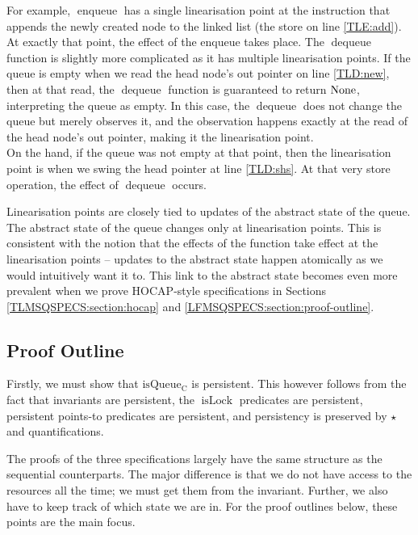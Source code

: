 \documentclass[a4paper, 10pt]{report}
\theoremstyle{definition}
\newcommand{\isLock}{\operatorname{isLock}}
\newcommand{\enqueue}{\operatorname{enqueue}}
\newcommand{\dequeue}{\operatorname{dequeue}}
\newcommand{\isqueueconc}{\operatorname{isQueue_{C}}}
\begin{document}
For example, $\enqueue$ has a single linearisation point at the instruction that appends the newly created node to the linked list (the store on line \ref{TLE:add}). At exactly that point, the effect of the enqueue takes place. The $\dequeue$ function is slightly more complicated as it has multiple linearisation points. If the queue is empty when we read the head node's out pointer on line \ref{TLD:new}, then at that read, the $\dequeue$ function is guaranteed to return $\operatorname{None}$, interpreting the queue as empty. In this case, the $\dequeue$ does not change the queue but merely observes it, and the observation happens exactly at the read of the head node's out pointer, making it the linearisation point.\\
On the hand, if the queue was not empty at that point, then the linearisation point is when we swing the head pointer at line \ref{TLD:shs}. At that very store operation, the effect of $\dequeue$ occurs.

Linearisation points are closely tied to updates of the abstract state of the queue. The abstract state of the queue changes only at linearisation points. This is consistent with the notion that the effects of the function take effect at the linearisation points -- updates to the abstract state happen atomically as we would intuitively want it to. This link to the abstract state becomes even more prevalent when we prove HOCAP-style specifications in Sections \ref{TLMSQSPECS:section:hocap} and \ref{LFMSQSPECS:section:proof-outline}.

\subsection{Proof Outline}
\label{TLMSQSPECS:concurrent:sub:proof-outline}
Firstly, we must show that $\isqueueconc$ is persistent. This however follows from the fact that invariants are persistent, the $\isLock$ predicates are persistent, persistent points-to predicates are persistent, and persistency is preserved by $\star{}$ and quantifications.

The proofs of the three specifications largely have the same structure as the sequential counterparts. The major difference is that we do not have access to the resources all the time; we must get them from the invariant. Further, we also have to keep track of which state we are in. For the proof outlines below, these points are the main focus.
\end{document}
